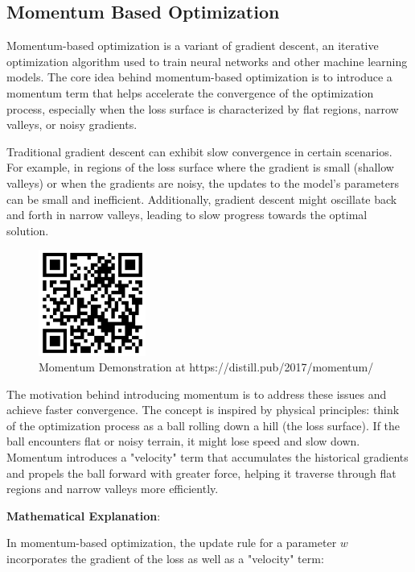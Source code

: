 \documentclass{report}
\begin{document}
\subsection{Momentum Based Optimization}

Momentum-based optimization is a variant of gradient descent, an iterative optimization algorithm used to train neural networks and other machine learning models. The core idea behind momentum-based optimization is to introduce a momentum term that helps accelerate the convergence of the optimization process, especially when the loss surface is characterized by flat regions, narrow valleys, or noisy gradients.

Traditional gradient descent can exhibit slow convergence in certain scenarios. For example, in regions of the loss surface where the gradient is small (shallow valleys) or when the gradients are noisy, the updates to the model's parameters can be small and inefficient. Additionally, gradient descent might oscillate back and forth in narrow valleys, leading to slow progress towards the optimal solution.

\begin{figure}[ht]
	\includegraphics[width=100pt]{19}
	\centering
	\caption{Momentum Demonstration at https://distill.pub/2017/momentum/}
\end{figure}

The motivation behind introducing momentum is to address these issues and achieve faster convergence. The concept is inspired by physical principles: think of the optimization process as a ball rolling down a hill (the loss surface). If the ball encounters flat or noisy terrain, it might lose speed and slow down. Momentum introduces a "velocity" term that accumulates the historical gradients and propels the ball forward with greater force, helping it traverse through flat regions and narrow valleys more efficiently.

\textbf{Mathematical Explanation}:

In momentum-based optimization, the update rule for a parameter \(w\) incorporates the gradient of the loss as well as a "velocity" term:
\end{document}
